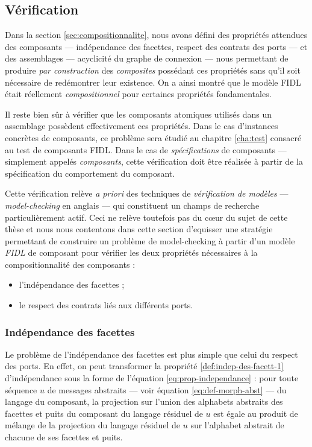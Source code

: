 \subsection{V\'erification}
\label{sec:verification}
Dans la section \ref{sec:compositionnalite}, nous avons d\'efini des
propri\'et\'es attendues des composants --- ind\'ependance des
facettes, respect des contrats des ports --- et des assemblages ---
acyclicit\'e du graphe de connexion --- nous permettant de produire
\emph{par construction} des \emph{composites} poss\'edant ces
propri\'et\'es sans qu'il soit n\'ecessaire de red\'emontrer
leur existence. On a ainsi montr\'e que le mod\`ele \textsf{FIDL}
\'etait r\'eellement \emph{compositionnel} pour certaines
propri\'et\'es fondamentales. 

Il reste bien s\^ur \`a v\'erifier que les composants atomiques
utilis\'es dans un assemblage poss\`edent effectivement ces
propri\'et\'es. Dans le cas d'instances concr\`etes de composants,
ce probl\`eme sera \'etudi\'e au chapitre \ref{cha:test}
consacr\'e au test de composants \textsf{FIDL}. Dans le cas 
de \emph{sp\'ecifications} de composants --- simplement appel\'es
\emph{composants}, cette v\'erification doit \^etre r\'ealis\'ee
\`a partir de la sp\'ecification du comportement du composant.

Cette v\'erification rel\`eve \emph{a priori} des techniques de
\emph{v\'erification de mod\`eles} --- \emph{model-checking} en
anglais --- qui constituent un champs de recherche particuli\`erement
actif. Ceci ne rel\`eve toutefois pas du c\oe ur du sujet de cette
th\`ese et nous nous contentons dans cette section d'equisser une
strat\'egie permettant de construire un probl\`eme de model-checking
\`a partir d'un mod\`ele \emph{FIDL} de composant pour v\'erifier
les deux propri\'et\'es n\'ecessaires \`a la compositionnalit\'e
des composants :
\begin{itemize}
  \item l'ind\'ependance des facettes ;
  \item le respect des contrats li\'es aux diff\'erents ports.
\end{itemize}

\subsubsection{Ind\'ependance des facettes}

Le probl\`eme de l'ind\'ependance des facettes est
plus simple que celui du respect des ports. En
effet, on peut transformer la propri\'et\'e
\ref{def:indep-des-facett-1}  d'ind\'ependance sous la forme de l'\'equation
\eqref{eq:prop-independance} : pour toute s\'equence $u$ de messages abstraits
--- voir \'equation \eqref{eq:def-morph-abst} --- du langage du
composant, la projection sur l'union des alphabets abstraits des
facettes et puits du
composant du langage r\'esiduel de $u$ est \'egale au
produit de m\'elange de la projection du langage r\'esiduel de $u$
sur l'alphabet abstrait de chacune de ses facettes 
et puits. 

